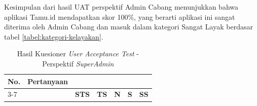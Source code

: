 Kesimpulan dari hasil UAT perspektif Admin Cabang menunjukkan bahwa aplikasi Tamu.id mendapatkan skor 100\%, yang berarti aplikasi ini sangat diterima oleh Admin Cabang dan masuk dalam kategori Sangat Layak berdasar tabel \ref{tabel:kategori-kelayakan}.


\begin{longtable}{|p{0.8cm}|p{7.5cm}|>{\centering\arraybackslash}p{0.8cm}|>{\centering\arraybackslash}p{0.8cm}|>{\centering\arraybackslash}p{0.8cm}|>{\centering\arraybackslash}p{0.8cm}|>{\centering\arraybackslash}p{0.8cm}|}
    \caption{Hasil Kuesioner \textit{User Acceptance Test} - Perspektif \textit{SuperAdmin}} \label{tabel:uat_superadmin}                                                                                                                                                               \\
    \hline
    \multirow{2}{*}{\textbf{No.}}              & \multirow{2}{*}{\textbf{Pertanyaan}}                                                                                                     & \multicolumn{5}{c|}{\textbf{Jawaban}}                                                       \\ \cline{3-7}
                                               &                                                                                                                                          & \textbf{STS}                          & \textbf{TS} & \textbf{N} & \textbf{S} & \textbf{SS} \\
    \hline
    \endfirsthead



\end{longtable}
